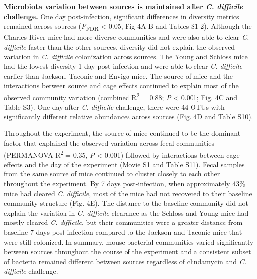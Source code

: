 \documentclass[
  11pt,
]{article}
\begin{document}
\textbf{Microbiota variation between sources is maintained after
\emph{C. difficile} challenge.} One day post-infection, significant
differences in diversity metrics remained across sources
(\emph{P}\textsubscript{FDR} \textless{} 0.05, Fig 4A-B and Tables
S1-2). Although the Charles River mice had more diverse communities and
were also able to clear \emph{C. difficile} faster than the other
sources, diversity did not explain the observed variation in \emph{C.
difficile} colonization across sources. The Young and Schloss mice had
the lowest diversity 1 day post-infection and were able to clear
\emph{C. difficile} earlier than Jackson, Taconic and Envigo mice. The
source of mice and the interactions between source and cage effects
continued to explain most of the observed community variation (combined
R\textsuperscript{2} = 0.88; \emph{P} \textless{} 0.001; Fig. 4C and
Table S3). One day after \emph{C. difficile} challenge, there were 44
OTUs with significantly different relative abundances across sources
(Fig. 4D and Table S10).

Throughout the experiment, the source of mice continued to be the
dominant factor that explained the observed variation across fecal
communities (PERMANOVA R\textsuperscript{2} = 0.35, \emph{P} \textless{}
0.001) followed by interactions between cage effects and the day of the
experiment (Movie S1 and Table S11). Fecal samples from the same source
of mice continued to cluster closely to each other throughout the
experiment. By 7 days post-infection, when approximately 43\% mice had
cleared \emph{C. difficile}, most of the mice had not recovered to their
baseline community structure (Fig. 4E). The distance to the baseline
community did not explain the variation in \emph{C. difficile} clearance
as the Schloss and Young mice had mostly cleared \emph{C. difficile},
but their communities were a greater distance from baseline 7 days
post-infection compared to the Jackson and Taconic mice that were still
colonized. In summary, mouse bacterial communities varied significantly
between sources throughout the course of the experiment and a consistent
subset of bacteria remained different between sources regardless of
clindamycin and \emph{C. difficile} challenge.
\end{document}

